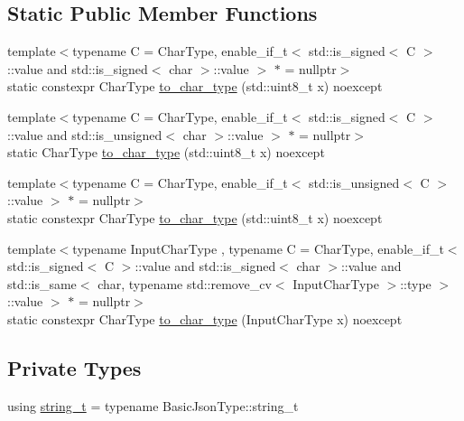\subsection*{Static Public Member Functions}
\begin{DoxyCompactItemize}
\item 
{\footnotesize template$<$typename C  = Char\+Type, enable\+\_\+if\+\_\+t$<$ std\+::is\+\_\+signed$<$ C $>$\+::value and std\+::is\+\_\+signed$<$ char $>$\+::value $>$ $\ast$  = nullptr$>$ }\\static constexpr Char\+Type \hyperlink{classnlohmann_1_1detail_1_1binary__writer_ab77aa48692bd4e64e4f051ce6aeb6d2d}{to\+\_\+char\+\_\+type} (std\+::uint8\+\_\+t x) noexcept
\item 
{\footnotesize template$<$typename C  = Char\+Type, enable\+\_\+if\+\_\+t$<$ std\+::is\+\_\+signed$<$ C $>$\+::value and std\+::is\+\_\+unsigned$<$ char $>$\+::value $>$ $\ast$  = nullptr$>$ }\\static Char\+Type \hyperlink{classnlohmann_1_1detail_1_1binary__writer_a5e46f0dd3550901b15cf85265808d1ec}{to\+\_\+char\+\_\+type} (std\+::uint8\+\_\+t x) noexcept
\item 
{\footnotesize template$<$typename C  = Char\+Type, enable\+\_\+if\+\_\+t$<$ std\+::is\+\_\+unsigned$<$ C $>$\+::value $>$ $\ast$  = nullptr$>$ }\\static constexpr Char\+Type \hyperlink{classnlohmann_1_1detail_1_1binary__writer_ab77aa48692bd4e64e4f051ce6aeb6d2d}{to\+\_\+char\+\_\+type} (std\+::uint8\+\_\+t x) noexcept
\item 
{\footnotesize template$<$typename Input\+Char\+Type , typename C  = Char\+Type, enable\+\_\+if\+\_\+t$<$ std\+::is\+\_\+signed$<$ C $>$\+::value and std\+::is\+\_\+signed$<$ char $>$\+::value and std\+::is\+\_\+same$<$ char, typename std\+::remove\+\_\+cv$<$ Input\+Char\+Type $>$\+::type $>$\+::value $>$ $\ast$  = nullptr$>$ }\\static constexpr Char\+Type \hyperlink{classnlohmann_1_1detail_1_1binary__writer_a2c2b2132ce56b3b45593374b622baa67}{to\+\_\+char\+\_\+type} (Input\+Char\+Type x) noexcept
\end{DoxyCompactItemize}
\subsection*{Private Types}
\begin{DoxyCompactItemize}
\item 
using \hyperlink{classnlohmann_1_1detail_1_1binary__writer_a29f2ae7a5c4a8c1dae47b3b2310de8a8}{string\+\_\+t} = typename Basic\+Json\+Type\+::string\+\_\+t
\end{DoxyCompactItemize}
